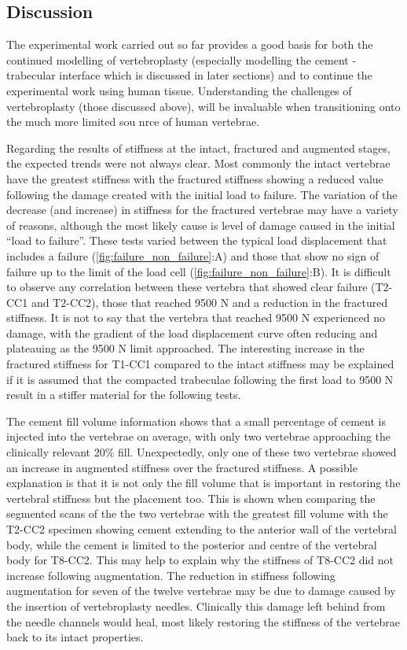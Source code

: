 \subsection{Discussion}\label{discussion-bov}

The experimental work carried out so far provides a good basis for both the continued modelling of vertebroplasty (especially modelling the cement - trabecular interface which is discussed in later sections) and to continue the experimental work using human tissue. Understanding the challenges of vertebroplasty (those discussed above), will be invaluable when transitioning onto the much more limited sou nrce of human vertebrae.


Regarding the results of stiffness at the intact, fractured and augmented stages, the expected trends were not always clear. Most commonly the intact vertebrae have the greatest stiffness with the fractured stiffness showing a reduced value following the damage created with the initial load to failure. The variation of the decrease (and increase) in stiffness for the fractured vertebrae may have a variety of reasons, although the most likely cause is level of damage caused in the initial ``load
to failure''. These tests varied between the typical load displacement that includes a failure (\cref{fig:failure_non_failure}:A) and those that show no sign of failure up to the limit of the load cell (\cref{fig:failure_non_failure}:B). It is difficult to observe any correlation between these vertebra that showed clear failure (T2-CC1 and T2-CC2), those that reached 9500 N and a reduction in the fractured stiffness. It is not to say that the vertebra that reached 9500 N experienced no damage, with the gradient of the load displacement curve often reducing and plateauing as the 9500 N limit approached. The interesting increase in the fractured stiffness for T1-CC1 compared to the intact stiffness may be explained if it is assumed that the compacted trabeculae following the first load to 9500 N result in a stiffer material for the following tests.

The cement fill volume information shows that a small percentage of cement is injected into the vertebrae on average, with only two vertebrae approaching the clinically relevant 20\% fill. Unexpectedly, only one of these two vertebrae showed an increase in augmented stiffness over the fractured stiffness. A possible explanation is that it is not only the fill volume that is important in restoring the vertebral stiffness but the placement too. This is shown when comparing the segmented scans of the the two vertebrae with the greatest fill volume with the T2-CC2 specimen showing cement extending to the anterior wall of the vertebral body, while the cement is limited to the posterior and centre of the vertebral body for T8-CC2. This may help to explain why the stiffness of T8-CC2 did not increase following augmentation. The reduction in stiffness following augmentation for seven of the twelve vertebrae may be due to damage caused by the insertion of vertebroplasty needles. Clinically this damage left behind from the needle channels would heal, most likely restoring the stiffness of the vertebrae back to its intact properties.

